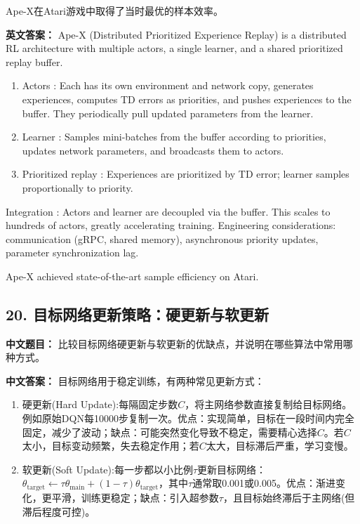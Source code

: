 \documentclass[10pt,a4paper]{ctexart}
\begin{document}
Ape-X在Atari游戏中取得了当时最优的样本效率。

\textbf{英文答案：}  
Ape-X (Distributed Prioritized Experience Replay) is a distributed RL architecture with multiple actors, a single learner, and a shared prioritized replay buffer.

\begin{enumerate}
    \item Actors : Each has its own environment and network copy, generates experiences, computes TD errors as priorities, and pushes experiences to the buffer. They periodically pull updated parameters from the learner.
    \item Learner : Samples mini-batches from the buffer according to priorities, updates network parameters, and broadcasts them to actors.
    \item Prioritized replay : Experiences are prioritized by TD error; learner samples proportionally to priority.
\end{enumerate}

 Integration : Actors and learner are decoupled via the buffer. This scales to hundreds of actors, greatly accelerating training. Engineering considerations: communication (gRPC, shared memory), asynchronous priority updates, parameter synchronization lag.

Ape-X achieved state-of-the-art sample efficiency on Atari.

\subsection*{20. 目标网络更新策略：硬更新与软更新}
\textbf{中文题目：} 比较目标网络硬更新与软更新的优缺点，并说明在哪些算法中常用哪种方式。

\textbf{中文答案：}  
目标网络用于稳定训练，有两种常见更新方式：

\begin{enumerate}
    \item 硬更新(Hard Update):每隔固定步数\(C\)，将主网络参数直接复制给目标网络。例如原始DQN每10000步复制一次。优点：实现简单，目标在一段时间内完全固定，减少了波动；缺点：可能突然变化导致不稳定，需要精心选择\(C\)。若\(C\)太小，目标变动频繁，失去稳定作用；若\(C\)太大，目标滞后严重，学习变慢。

    \item 软更新(Soft Update):每一步都以小比例\(\tau\)更新目标网络：\(\theta_{\text{target}} \leftarrow \tau \theta_{\text{main}} + (1-\tau) \theta_{\text{target}}\)，其中\(\tau\)通常取0.001或0.005。优点：渐进变化，更平滑，训练更稳定；缺点：引入超参数\(\tau\)，且目标始终滞后于主网络(但滞后程度可控)。
\end{enumerate}
\end{document}
